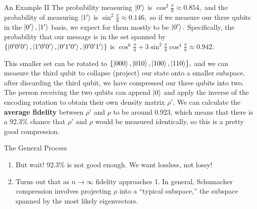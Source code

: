 \documentclass{beamer}
\begin{document}
\begin{frame}{An Example II}
The probability measuring $\ket{0'}$ is $\cos^2\frac\pi 8\approx0.854,$ and the probability of measuring $\ket{1'}$ is $\sin^2\frac\pi 8\approx0.146,$ so if we measure our three qubits in the $\ket{0'},\ket{1'}$ basis, we expect for them mostly to be $\ket{0'}.$ Specifically, the probability that our message is in the set spanned by $\{\ket{0'0'0'},\ket{1'0'0'},\ket{0'1'0'},\ket{0'0'1'}\}$ is $\cos^6\frac\pi 8+3\sin^2\frac\pi 8\cos^4\frac\pi 8\approx0.942.$ 

This smaller set can be rotated to $\{\ket{000},\ket{010},\ket{100},\ket{110}\},$ and we can measure the third qubit to collapse (project) our state onto a smaller subspace. after discarding the third qubit, we have compressed our three qubits into two. The person receiving the two qubits can append $\ket{0}$ and apply the inverse of the encoding rotation to obtain their own density matrix $\rho'.$ We can calculate the \textbf{average fidelity} between $\rho'$ and $\rho$ to be around 0.923, which means that there is a 92.3\% chance that $\rho'$ and $\rho$ would be measured identically, so this is a pretty good compression.
\end{frame}
\begin{frame}{The General Process}


\begin{enumerate}
    \item But wait! 92.3\% is not good enough. We want lossless, not lossy!
    \item Turns out that as $n\to\infty$ fidelity approaches 1. In general, Schumacher compression involves projecting $\rho$ into a ``typical subspace,'' the subspace spanned by the most likely eigenvectors.
\end{enumerate}

\end{frame}
\end{document}
